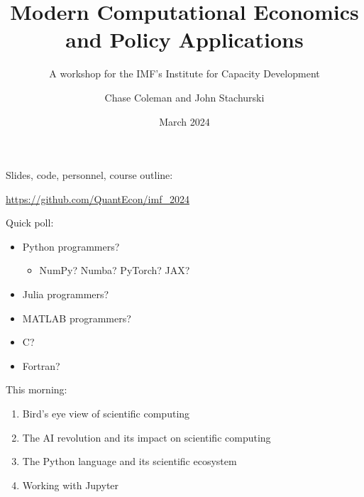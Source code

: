 \documentclass[
    xcolor={svgnames,dvipsnames},
    hyperref={colorlinks, citecolor=DeepPink4, linkcolor=DarkRed, urlcolor=DarkBlue}
    ]{beamer}  %
\title{Modern Computational Economics \\ and Policy Applications}
\subtitle{A workshop for the IMF's Institute for Capacity Development}
\author{Chase Coleman and John Stachurski}
\date{March 2024}
\newcommand{\1}{\mathbbm 1}
\begin{document}
\begin{frame}
  \titlepage
\end{frame}




\begin{frame}
    
    Slides, code, personnel, course outline:

    \vspace{0.5em}
    \vspace{0.5em}
    \vspace{0.5em}
    \begin{center}
    \url{https://github.com/QuantEcon/imf_2024}
    \end{center}

\end{frame}

\begin{frame}
    
    Quick poll:

    \begin{itemize}
        \item Python programmers?
    \vspace{0.5em}
            \begin{itemize}
                \item NumPy?  Numba?  PyTorch? JAX?
            \end{itemize}
    \vspace{0.5em}
        \item Julia programmers?
    \vspace{0.5em}
        \item MATLAB programmers?
    \vspace{0.5em}
        \item C?
    \vspace{0.5em}
        \item Fortran?
    \end{itemize}
    
\end{frame}

\begin{frame}
    
    This morning:

    \begin{enumerate}
        \item Bird's eye view of scientific computing
        \vspace{0.5em}
        \item The AI revolution and its impact on scientific computing
        \vspace{0.5em}
        \item The Python language and its scientific ecosystem
        \vspace{0.5em}
        \item Working with Jupyter
    \end{enumerate}

\end{frame}
\end{document}
